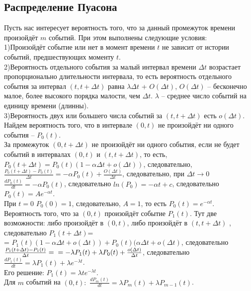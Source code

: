 \documentclass[russian, 12pt, fleqn,x11names]{article}
\begin{document}
\subsection{Распределение Пуасона}
\noindent
Пусть нас интересует вероятность того, что за данный промежуток времени произойдёт $m$ событий. При этом выполнены следующие условия:\\
1)Произойдёт событие или нет в момент времени $t$ не зависит от истории событий, предшествующих моменту $t$.\\
2)Вероятность отдельного события за малый интервал времени $\Delta t$ возрастает пропорционально длительности интервала, то есть вероятность отдельного события за интервал $(t, t + \Delta t)$ равна $\lambda \Delta t$ + $O(\Delta t)$, $O(\Delta t)$ -- бесконечно малое, более высокого порядка малости, чем $\Delta t$. $\lambda$  -- среднее число событий на единицу времени (длинны).\\
3)Вероятность двух или большего числа событий за $(t, t + \Delta t)$ есть $o(\Delta t)$.\\
Найдем вероятность того, что в интервале $(0, t)$ не произойдёт ни одного события -- $P_0(t)$.\\
За промежуток $(0, t + \Delta t)$ не произойдёт ни одного события, если не будет событий в интервалах $(0, t)$ и $(t, t+\Delta t)$, то есть,
$P_0(t+\Delta t) = P_0(t)(1-\alpha\Delta t + o(\Delta t))$, следовательно, $\frac{P_0(t+\Delta t) - P_0(t)}{\Delta t} = -\alpha P_0(t) + \frac{O(\Delta t)}{\Delta t}$, следовательно, при $\Delta   t  \rightarrow 0$ $\frac{dP_0(t)}{dt}  = -\alpha P_0(t)$, следовательно $ln(P_0) = -\alpha t + c$, следовательно $P_0(t) = Ae^{-\alpha t}$.\\
При $t = 0$ $P_0(0)  = 1$, следовательно, $A = 1$, то есть $P_0(t) = e^{-\alpha t}$.\\
Вероятность того, что за $(0, t)$ произойдёт событие $P_1(t)$. 
Тут две возможности: либо произойдёт в $(0, t)$, либо произойдёт в $(t, t + \Delta t)$ , следовательно $P_1(t+\Delta t)$=\\= $P_1(t)(1-\alpha \Delta t + o(\Delta t)) + P_0(t)(\alpha \Delta t + o(\Delta t)$,
 следовательно $\frac{P_1(t+\Delta t) - P_1(t)}{\Delta t} =\\= -\lambda P_1(t) + \lambda P_0(t) + \frac{o(\Delta t)}{\Delta t}$,  следовательно $\frac{dP_1(t)}{dt}  = \lambda P_1(t) + \lambda e^{-\lambda t}$.\\
 Его решение: $P_1(t) = \lambda t e^{-\lambda t}$.\\
Для $m$ событий на $(0, t):$
$\frac{dP_m(t)}{dt} = \lambda P_m(t) + \lambda P_{m-1}(t)$.\\
\end{document}
